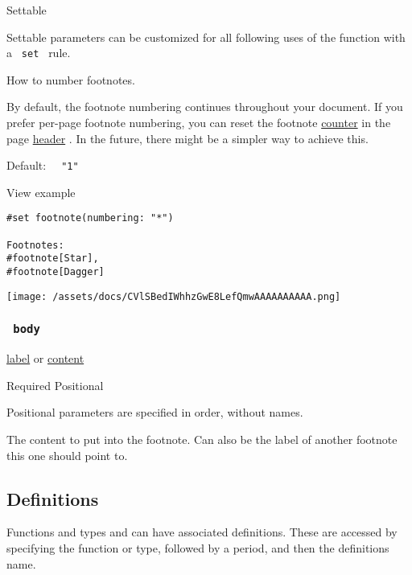 {{ Settable }}

\label{parameters-numbering-settable-tooltip}
Settable parameters can be customized for all following uses of the
function with a \texttt{\ set\ } rule.

How to number footnotes.

By default, the footnote numbering continues throughout your document.
If you prefer per-page footnote numbering, you can reset the footnote
\href{/docs/reference/introspection/counter/}{counter} in the page
\href{/docs/reference/layout/page/\#parameters-header}{header} . In the
future, there might be a simpler way to achieve this.

Default: \texttt{\ }{\texttt{\ "1"\ }}\texttt{\ }


View example

\begin{verbatim}
#set footnote(numbering: "*")

Footnotes:
#footnote[Star],
#footnote[Dagger]
\end{verbatim}

\texttt{[image: /assets/docs/CVlSBedIWhhzGwE8LefQmwAAAAAAAAAA.png]}

\subsubsection{\texorpdfstring{\texttt{\ body\ }}{ body }}\label{parameters-body}

\href{/docs/reference/foundations/label/}{label} {or}
\href{/docs/reference/foundations/content/}{content}

{Required} {{ Positional }}

\label{parameters-body-positional-tooltip}
Positional parameters are specified in order, without names.

The content to put into the footnote. Can also be the label of another
footnote this one should point to.

\subsection{\texorpdfstring{{ Definitions
}}{ Definitions }}\label{definitions}

\label{definitions-tooltip}
Functions and types and can have associated definitions. These are
accessed by specifying the function or type, followed by a period, and
then the definition\textquotesingle s name.


